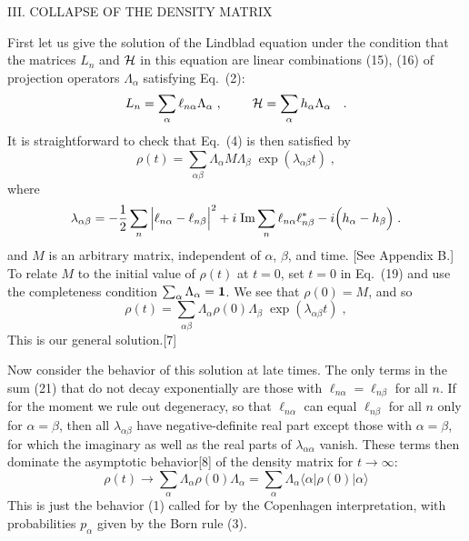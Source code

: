 \begin{center}
III. COLLAPSE OF THE DENSITY MATRIX
\end{center}

First let us give the solution of the Lindblad equation under the condition that the matrices $L_n$ and ${\cal H}$ in this equation are linear combinations (15), (16) of projection operators $\Lambda_\alpha$ satisfying Eq.~(2):
$$ 
L_n=\sum_{\alpha}\ell_{n\alpha}\Lambda_\alpha\;,~~~~~~~
{\cal H}=\sum_{\alpha}h_{\alpha}\Lambda_\alpha~~\;.$$
It is straightforward to check that Eq.~(4) is then satisfied by
\begin{equation}
\rho(t)=\sum_{\alpha\beta}\Lambda_\alpha M \Lambda_\beta\;\exp(\lambda_{\alpha\beta}t)\;,
\end{equation}
where
\begin{equation}
\lambda_{\alpha\beta}=-\frac{1}{2}\sum_n\Big|\ell_{n\alpha}-\ell_{n\beta}\Big|^2+i\;{\rm Im}\sum_n \ell_{n\alpha}\ell^*_{n\beta}
-i\Big(h_{\alpha}-h_{\beta}\Big)\;.
\end{equation}
and $M$ is an arbitrary  matrix, independent of $\alpha$, $\beta$, and time. [See Appendix B.]  To relate $M$ to the initial value of $\rho(t)$ at $t=0$, set $t=0$ in Eq.~(19) and use the completeness condition $\sum_\alpha\Lambda_\alpha=\mbox{\boldmath{$1$}}$.  We see that $\rho(0)=M$, and so
\begin{equation}
\rho(t)=\sum_{\alpha\beta}\Lambda_\alpha \rho(0) \Lambda_\beta\;\exp(\lambda_{\alpha\beta}t)\;,
\end{equation}
This is our general solution.[7]

Now consider the behavior of this solution at late times.  The only terms in the sum (21) that do not decay exponentially are those with $\ell_{n\alpha}=\ell_{n\beta}$ for all $n$.  
If for the moment we rule out degeneracy,  so that $\ell_{n\alpha}$ can equal $\ell_{n\beta}$ for all $n$ only for $\alpha=\beta$, then all $\lambda_{\alpha\beta}$ have negative-definite real part except those with $\alpha=\beta$, for which the imaginary as well as the real parts of $\lambda_{\alpha\alpha}$ vanish.  These terms then dominate the asymptotic behavior[8]  of the density matrix for $t\rightarrow \infty$:
\begin{equation}
\rho(t)\rightarrow \sum_\alpha \Lambda_\alpha\rho(0)\Lambda_\alpha=\sum_\alpha \Lambda_\alpha \langle \alpha|\rho(0)|\alpha\rangle
\end{equation}
This is just the behavior (1) called for by the Copenhagen interpretation, with probabilities $p_\alpha$ given by the Born rule (3).  

